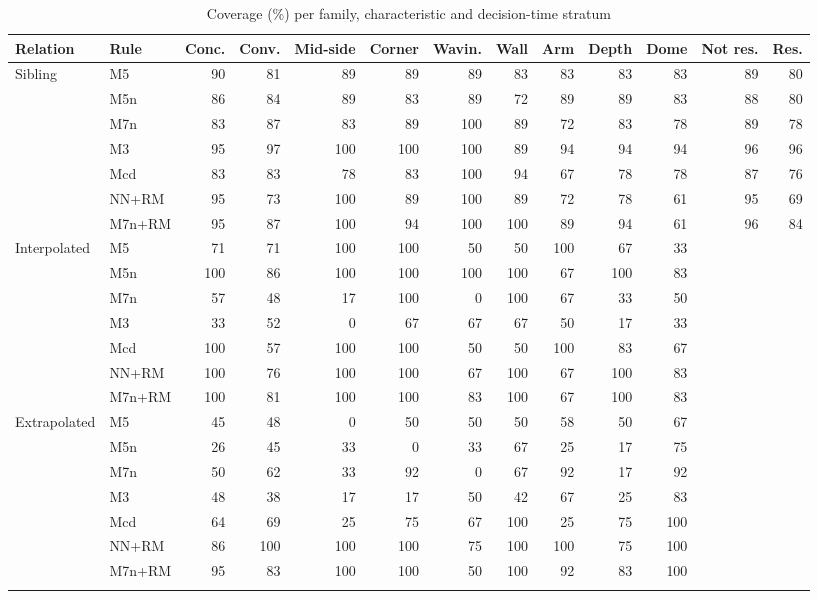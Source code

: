 \documentclass[pdflatex,sn-basic]{sn-jnl}
\newcommand{\tabsizesmall}{\footnotesize}
\begin{document}
\begin{table}[p]
\tabsizesmall
\setlength{\tabcolsep}{2.1pt}
\caption{Coverage (\%) per family, characteristic and decision-time stratum}\label{tab:s-coverage-detail}
\begin{tabular}{@{}llrrrrrrrrrrr@{}}
\toprule
Relation & Rule & Conc. & Conv. & Mid-side & Corner & Wavin. & Wall & Arm & Depth & Dome & Not res. & Res. \\
\midrule
Sibling & M5 & 90 & 81 & 89 & 89 & 89 & 83 & 83 & 83 & 83 & 89 & 80 \\
 & M5n & 86 & 84 & 89 & 83 & 89 & 72 & 89 & 89 & 83 & 88 & 80 \\
 & M7n & 83 & 87 & 83 & 89 & 100 & 89 & 72 & 83 & 78 & 89 & 78 \\
 & M3 & 95 & 97 & 100 & 100 & 100 & 89 & 94 & 94 & 94 & 96 & 96 \\
 & Mcd & 83 & 83 & 78 & 83 & 100 & 94 & 67 & 78 & 78 & 87 & 76 \\
 & NN+RM & 95 & 73 & 100 & 89 & 100 & 89 & 72 & 78 & 61 & 95 & 69 \\
 & M7n+RM & 95 & 87 & 100 & 94 & 100 & 100 & 89 & 94 & 61 & 96 & 84 \\
Interpolated & M5 & 71 & 71 & 100 & 100 & 50 & 50 & 100 & 67 & 33 &  & \\
 & M5n & 100 & 86 & 100 & 100 & 100 & 100 & 67 & 100 & 83 &  & \\
 & M7n & 57 & 48 & 17 & 100 & 0 & 100 & 67 & 33 & 50 &  & \\
 & M3 & 33 & 52 & 0 & 67 & 67 & 67 & 50 & 17 & 33 &  & \\
 & Mcd & 100 & 57 & 100 & 100 & 50 & 50 & 100 & 83 & 67 &  & \\
 & NN+RM & 100 & 76 & 100 & 100 & 67 & 100 & 67 & 100 & 83 &  & \\
 & M7n+RM & 100 & 81 & 100 & 100 & 83 & 100 & 67 & 100 & 83 &  & \\
Extrapolated & M5 & 45 & 48 & 0 & 50 & 50 & 50 & 58 & 50 & 67 &  & \\
 & M5n & 26 & 45 & 33 & 0 & 33 & 67 & 25 & 17 & 75 &  & \\
 & M7n & 50 & 62 & 33 & 92 & 0 & 67 & 92 & 17 & 92 &  & \\
 & M3 & 48 & 38 & 17 & 17 & 50 & 42 & 67 & 25 & 83 &  & \\
 & Mcd & 64 & 69 & 25 & 75 & 67 & 100 & 25 & 75 & 100 &  & \\
 & NN+RM & 86 & 100 & 100 & 100 & 75 & 100 & 100 & 75 & 100 &  & \\
 & M7n+RM & 95 & 83 & 100 & 100 & 50 & 100 & 92 & 83 & 100 &  & \\
\botrule
\end{tabular}
\end{table}
\end{document}
